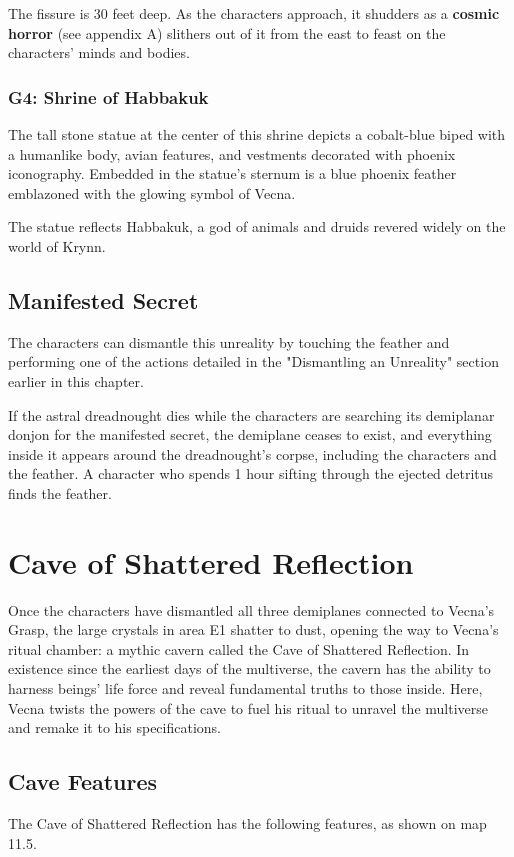 \documentclass[10pt,a4paper,twoside,bg=print,twocolumn,openany,nodeprecatedcode]{dndbook}
\begin{document}
The fissure is 30 feet deep. As the characters approach, it shudders as a \textbf{cosmic horror} (see appendix A) slithers out of it from the east to feast on the characters' minds and bodies.

\subsubsection{G4: Shrine of Habbakuk}
\begin{DndReadAloud}{}
The tall stone statue at the center of this shrine depicts a cobalt-blue biped with a humanlike body, avian features, and vestments decorated with phoenix iconography. Embedded in the statue's sternum is a blue phoenix feather emblazoned with the glowing symbol of Vecna.

\end{DndReadAloud}

The statue reflects Habbakuk, a god of animals and druids revered widely on the world of Krynn.

\subsection{Manifested Secret}
The characters can dismantle this unreality by touching the feather and performing one of the actions detailed in the "Dismantling an Unreality" section earlier in this chapter.

If the astral dreadnought dies while the characters are searching its demiplanar donjon for the manifested secret, the demiplane ceases to exist, and everything inside it appears around the dreadnought's corpse, including the characters and the feather. A character who spends 1 hour sifting through the ejected detritus finds the feather.

\section{Cave of Shattered Reflection}
Once the characters have dismantled all three demiplanes connected to Vecna's Grasp, the large crystals in area E1 shatter to dust, opening the way to Vecna's ritual chamber: a mythic cavern called the Cave of Shattered Reflection. In existence since the earliest days of the multiverse, the cavern has the ability to harness beings' life force and reveal fundamental truths to those inside. Here, Vecna twists the powers of the cave to fuel his ritual to unravel the multiverse and remake it to his specifications.

\subsection{Cave Features}
The Cave of Shattered Reflection has the following features, as shown on map 11.5.
\end{document}
